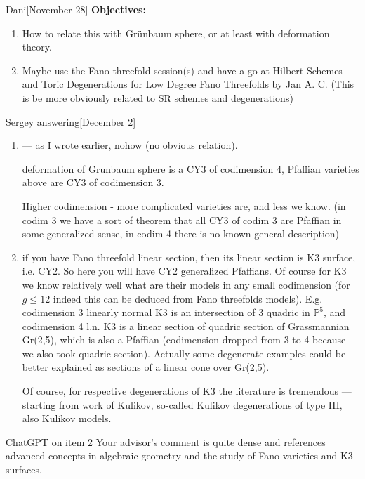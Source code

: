 \begin{thing3}{Dani}[November 28]
\textbf{Objectives:} 
\begin{enumerate}
\item How to relate this with Grünbaum sphere, or at least with deformation theory.
\item  Maybe use the Fano threefold session(s) and have a go at Hilbert Schemes and Toric Degenerations for Low Degree Fano Threefolds by Jan A. C. (This is be more obviously related to SR schemes and degenerations)
\end{enumerate}
\end{thing3}

\begin{thing14}{Sergey answering}[December 2]\leavevmode
	\begin{enumerate}
	\item  — as I wrote earlier, nohow (no obvious relation).

deformation of Grunbaum sphere is a CY3 of codimension 4,
Pfaffian varieties above are CY3 of codimension 3.

Higher codimension - more complicated varieties are, and less we know.
(in codim 3 we have a sort of theorem that all CY3 of codim 3 are Pfaffian in some generalized sense,
in codim 4 there is no known general description)

\item if you have Fano threefold linear section, then its linear section is K3 surface, i.e. CY2. So here you will have CY2 generalized Pfaffians. Of course for K3 we know relatively well what are their models in any small codimension (for $g\leq 12$  indeed this can be deduced from Fano threefolds models). E.g. codimension 3 linearly normal K3 is an intersection of 3 quadric in $\mathbb{P}^5$, and codimension 4 l.n. K3 is a linear section of quadric section of Grassmannian Gr(2,5), which is also a Pfaffian (codimension dropped from 3 to 4 because we also took quadric section). Actually some degenerate examples could be better explained as sections of a linear cone over Gr(2,5).

	Of course, for respective degenerations of K3 the literature is tremendous — starting from work of Kulikov, so-called Kulikov degenerations of type III, also Kulikov models.
\end{enumerate}
\end{thing14}

\begin{thing2}{ChatGPT on item 2}\leavevmode
	Your advisor's comment is quite dense and references advanced concepts in algebraic geometry and the study of Fano varieties and K3 surfaces.
\end{thing2}

